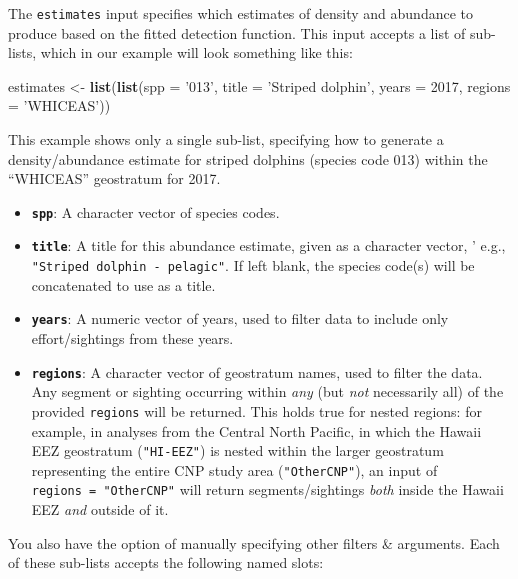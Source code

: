 \documentclass[
]{book}
\newenvironment{Shaded}{\begin{snugshade}}{\end{snugshade}}
\newcommand{\DataTypeTok}[1]{\textcolor[rgb]{0.13,0.29,0.53}{#1}}
\newcommand{\DecValTok}[1]{\textcolor[rgb]{0.00,0.00,0.81}{#1}}
\newcommand{\KeywordTok}[1]{\textcolor[rgb]{0.13,0.29,0.53}{\textbf{#1}}}
\newcommand{\NormalTok}[1]{#1}
\newcommand{\StringTok}[1]{\textcolor[rgb]{0.31,0.60,0.02}{#1}}
\begin{document}
The \texttt{estimates} input specifies which estimates of density and abundance to produce based on the fitted detection function. This input accepts a list of sub-lists, which in our example will look something like this:

\begin{Shaded}
\begin{Highlighting}[]
\NormalTok{estimates <-}\StringTok{ }\KeywordTok{list}\NormalTok{(}\KeywordTok{list}\NormalTok{(}\DataTypeTok{spp =} \StringTok{'013'}\NormalTok{,}
                       \DataTypeTok{title =} \StringTok{'Striped dolphin'}\NormalTok{,}
                       \DataTypeTok{years =} \DecValTok{2017}\NormalTok{,}
                       \DataTypeTok{regions =} \StringTok{'WHICEAS'}\NormalTok{))}
\end{Highlighting}
\end{Shaded}

This example shows only a single sub-list, specifying how to generate a density/abundance estimate for striped dolphins (species code 013) within the ``WHICEAS'' geostratum for 2017.

\begin{itemize}
\item
  \textbf{\texttt{spp}}: A character vector of species codes.
\item
  \textbf{\texttt{title}}: A title for this abundance estimate, given as a character vector, ' e.g., \texttt{"Striped\ dolphin\ -\ pelagic"}. If left blank, the species code(s) will be concatenated to use as a title.
\item
  \textbf{\texttt{years}}: A numeric vector of years, used to filter data to include only effort/sightings from these years.
\item
  \textbf{\texttt{regions}}: A character vector of geostratum names, used to filter the data. Any segment or sighting occurring within \emph{any} (but \emph{not} necessarily all) of the provided \texttt{regions} will be returned. This holds true for nested regions: for example, in analyses from the Central North Pacific, in which the Hawaii EEZ geostratum (\texttt{"HI-EEZ"}) is nested within the larger geostratum representing the entire CNP study area (\texttt{"OtherCNP"}), an input of \texttt{regions\ =\ "OtherCNP"} will return segments/sightings \emph{both} inside the Hawaii EEZ \emph{and} outside of it.
\end{itemize}

You also have the option of manually specifying other filters \& arguments. Each of these sub-lists accepts the following named slots:
\end{document}
